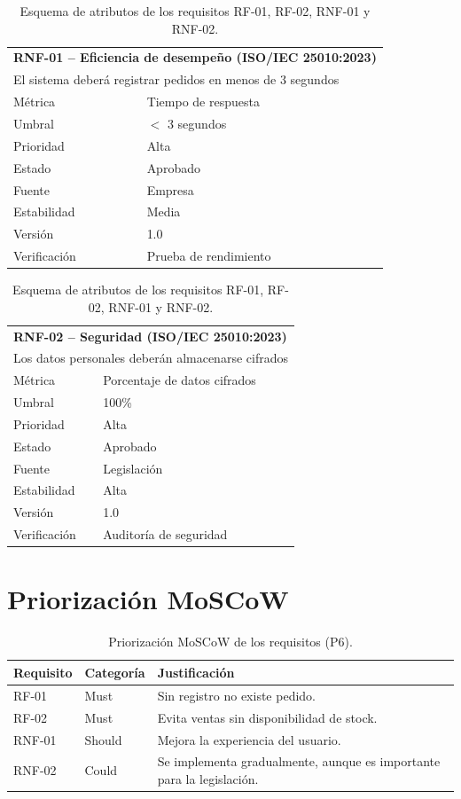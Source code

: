 \documentclass[11pt,a4paper]{article}
\begin{document}
\begin{table}[h!]
\begin{tabular}{ll}
\toprule
\multicolumn{2}{l}{\textbf{RNF-01 -- Eficiencia de desempeño (ISO/IEC 25010:2023)}} \\
\multicolumn{2}{l}{El sistema deberá registrar pedidos en menos de 3 segundos} \\
\midrule
Métrica & Tiempo de respuesta \\
Umbral & $<$ 3 segundos \\
Prioridad & Alta \\
Estado & Aprobado \\
Fuente & Empresa \\
Estabilidad & Media \\
Versión & 1.0 \\
Verificación & Prueba de rendimiento \\
\bottomrule
\end{tabular}
\hfill
\begin{tabular}{ll}
\toprule
\multicolumn{2}{l}{\textbf{RNF-02 -- Seguridad (ISO/IEC 25010:2023)}} \\
\multicolumn{2}{l}{Los datos personales deberán almacenarse cifrados} \\
\midrule
Métrica & Porcentaje de datos cifrados \\
Umbral & 100\% \\
Prioridad & Alta \\
Estado & Aprobado \\
Fuente & Legislación \\
Estabilidad & Alta \\
Versión & 1.0 \\
Verificación & Auditoría de seguridad \\
\bottomrule
\end{tabular}
\caption{Esquema de atributos de los requisitos RF-01, RF-02, RNF-01 y RNF-02.}
\end{table}

\newpage
\section{Priorización MoSCoW}
\label{sec:p6}

\begin{table}[h!]
\centering
\begin{tabular}{lll}
\toprule
\textbf{Requisito} & \textbf{Categoría} & \textbf{Justificación} \\
\midrule
RF-01  & Must   & Sin registro no existe pedido. \\
RF-02  & Must   & Evita ventas sin disponibilidad de stock. \\
RNF-01 & Should & Mejora la experiencia del usuario. \\
RNF-02 & Could  & Se implementa gradualmente, aunque es importante para la legislación. \\
\bottomrule
\end{tabular}
\caption{Priorización MoSCoW de los requisitos (P6).}
\end{table}
\end{document}
